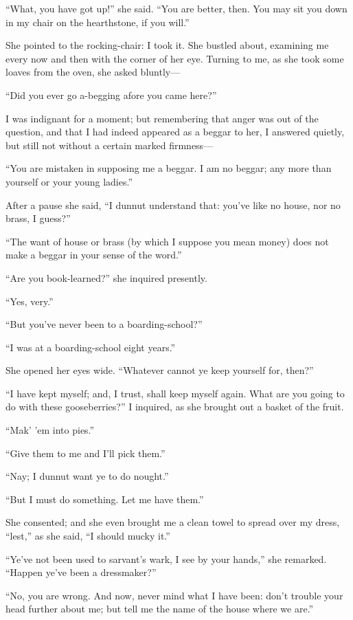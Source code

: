 \enquote{What, you have got up!} she said. \enquote{You are better,
then. You may sit you down in my chair on the hearthstone, if you
will.}

She pointed to the rocking-chair: I took it. She bustled about,
examining me every now and then with the corner of her eye. Turning to
me, as she took some loaves from the oven, she asked bluntly---

\enquote{Did you ever go a-begging afore you came here?}

I was indignant for a moment; but remembering that anger was out of the
question, and that I had indeed appeared as a beggar to her, I answered
quietly, but still not without a certain marked firmness---

\enquote{You are mistaken in supposing me a beggar. I am no beggar; any
more than yourself or your young ladies.}

After a pause she said, \enquote{I dunnut understand that: you've like
no house, nor no brass, I guess?}

\enquote{The want of house or brass (by which I suppose you mean money)
does not make a beggar in your sense of the word.}

\enquote{Are you book-learned?} she inquired presently.

\enquote{Yes, very.}

\enquote{But you've never been to a boarding-school?}

\enquote{I was at a boarding-school eight years.}

She opened her eyes wide. \enquote{Whatever cannot ye keep yourself
for, then?}

\enquote{I have kept myself; and, I trust, shall keep myself again. 
What are you going to do with these gooseberries?} I inquired, as she
brought out a basket of the fruit.

\enquote{Mak' 'em into pies.}

\enquote{Give them to me and I'll pick them.}

\enquote{Nay; I dunnut want ye to do nought.}

\enquote{But I must do something. Let me have them.}

She consented; and she even brought me a clean towel to spread over my
dress, \enquote{lest,} as she said, \enquote{I should mucky it.}

\enquote{Ye've not been used to sarvant's wark, I see by your hands,}
she remarked. \enquote{Happen ye've been a dressmaker?}

\enquote{No, you are wrong. And now, never mind what I have been: don't
trouble your head further about me; but tell me the name of the house
where we are.}

